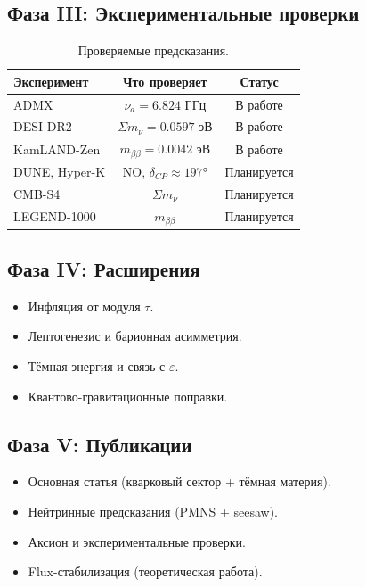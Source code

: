 \documentclass[12pt,a4paper]{article}
\numberwithin{equation}{section}
\begin{document}
\subsection{Фаза III: Экспериментальные проверки}

\begin{table}[H]
\centering
\caption{Проверяемые предсказания.}
\begin{tabular}{lcc}
\toprule
Эксперимент & Что проверяет & Статус \\
\midrule
ADMX & $\nu_a = 6.824$ ГГц & В работе \\
DESI DR2 & $\Sigma m_\nu = 0.0597$ эВ & В работе \\
KamLAND-Zen & $m_{\beta\beta} = 0.0042$ эВ & В работе \\
DUNE, Hyper-K & NO, $\delta_{CP} \approx 197°$ & Планируется \\
CMB-S4 & $\Sigma m_\nu$ & Планируется \\
LEGEND-1000 & $m_{\beta\beta}$ & Планируется \\
\bottomrule
\end{tabular}
\end{table}

\subsection{Фаза IV: Расширения}

\begin{itemize}[leftmargin=1.5em]
\item Инфляция от модуля $\tau$.
\item Лептогенезис и барионная асимметрия.
\item Тёмная энергия и связь с $\varepsilon$.
\item Квантово-гравитационные поправки.
\end{itemize}

\subsection{Фаза V: Публикации}

\begin{itemize}[leftmargin=1.5em]
\item Основная статья (кварковый сектор + тёмная материя).
\item Нейтринные предсказания (PMNS + seesaw).
\item Аксион и экспериментальные проверки.
\item Flux-стабилизация (теоретическая работа).
\end{itemize}
\end{document}
